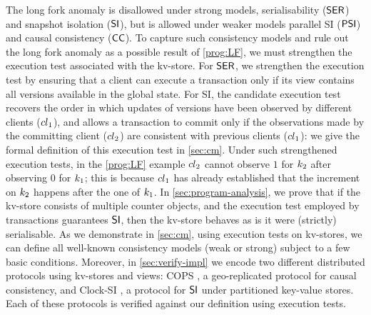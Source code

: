 The long fork anomaly is disallowed under strong models, \eg serialisability (\(\mathsf{SER}\)) and snapshot isolation (\(\mathsf{SI}\)), 
but is allowed under weaker models \eg parallel SI (\(\mathsf{PSI}\)) and causal consistency (\(\mathsf{CC}\)). 
To capture such consistency models and rule out the long fork anomaly as a possible result 
of \eqref{prog:LF}, we must strengthen the execution test associated with the kv-store. 
For \(\mathsf{SER}\), we strengthen the execution test by ensuring that a client can execute a transaction 
only if its view contains all versions available in the global state. 
For SI, the candidate execution test recovers the order in which 
updates of versions have been observed by different clients (\eg ${cl}_1$), 
and allows a transaction to commit only if the observations made by the committing client (\eg ${cl}_2$) are consistent with previous clients (\ie ${cl}_1$): we give the formal definition of this execution test  in \cref{sec:cm}.
Under such strengthened execution tests, in the \eqref{prog:LF} example ${cl}_2$ cannot
observe $1$ for $k_2$ after observing $0$ for $k_1$; 
this is because ${cl}_1$ has already established that the increment on $k_2$ happens after 
the one of $k_1$. 
In \cref{sec:program-analysis}, we prove that if the kv-store consists of multiple counter objects, and the execution test employed by transactions guarantees \( \mathsf{SI} \), then the kv-store 
behaves as is it were (strictly) serialisable.
As we demonstrate in \cref{sec:cm}, using execution tests on kv-stores, we can define all well-known consistency models (weak or strong) subject to a few basic conditions. 
Moreover, in \cref{sec:verify-impl} we encode two different distributed protocols using kv-stores and views: COPS \cite{cops}, 
a geo-replicated protocol for causal consistency, and Clock-SI \cite{clocksi}, a protocol for \(\mathsf{SI}\) under partitioned key-value stores.
Each of these protocols is verified against our definition using execution tests.
